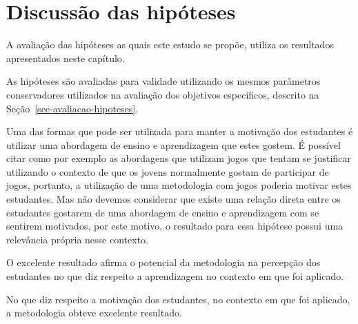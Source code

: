 \section{Discussão das hipóteses}
A avaliação das hipóteses as quais este estudo se propõe,
utiliza os resultados apresentados neste capítulo.

As hipóteses são avaliadas para validade utilizando os mesmos
parâmetros conservadores utilizados na avaliação dos objetivos
específicos, descrito na Seção~\ref{sec-avaliacao-hipoteses}.



Uma das formas que pode ser utilizada para manter a motivação
dos estudantes é utilizar uma abordagem de ensino e
aprendizagem que estes gostem.
É possível citar como por exemplo as abordagens que utilizam
jogos que tentam se justificar utilizando o contexto de que os
jovens normalmente gostam de participar de jogos, portanto,
a utilização de uma metodologia com jogos poderia motivar estes
estudantes.
Mas não devemos considerar que existe uma relação direta
entre os estudantes gostarem de uma abordagem de ensino
e aprendizagem com se sentirem motivados, por este motivo,
o resultado para essa hipótese possui uma relevância própria
nesse contexto.



O excelente resultado afirma o potencial da metodologia
na percepção dos estudantes no que diz respeito
a aprendizagem no contexto em que foi aplicado.


\AprovacaoObjetivoResultado{}{}{}{}{}{}{}{}{}

No que diz respeito a motivação dos estudantes,
no contexto em que foi aplicado,
a metodologia obteve excelente resultado.
